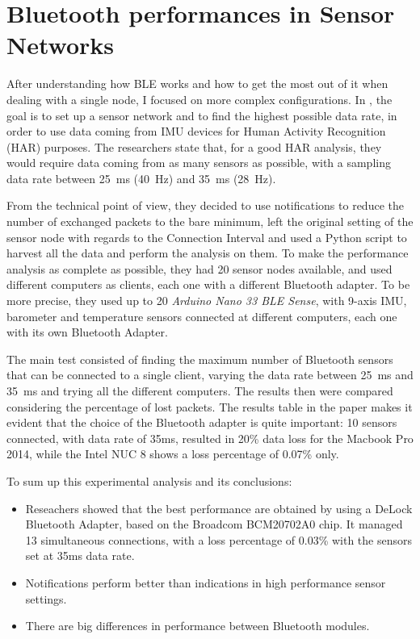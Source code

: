 \section{Bluetooth performances in Sensor Networks} 
After understanding how BLE works and how to get the most out of it when dealing with a single node, I focused on more complex configurations. In \cite{reich2020bluetooth}, the goal is to set up a sensor network and to find the highest possible data rate, in order to use data coming from IMU devices for Human Activity Recognition (HAR) purposes. The researchers state that, for a good HAR analysis, they would require data coming from as many sensors as possible, with a sampling data rate between 25~ms (40~Hz) and 35~ms (28~Hz).     

From the technical point of view, they decided to use notifications to reduce the number of exchanged packets to the bare minimum, left the original setting of the sensor node with regards to the Connection Interval and used a Python script to harvest all the data and perform the analysis on them. To make the performance analysis as complete as possible, they had 20 sensor nodes available, and used different computers as clients, each one with a different Bluetooth adapter. To be more precise, they used up to 20 \textit{Arduino Nano 33 BLE Sense}, with 9-axis IMU, barometer and temperature sensors connected at different computers, each one with its own Bluetooth Adapter. 

The main test consisted of finding the maximum number of Bluetooth sensors that can be connected to a single client, varying the data rate between 25~ms and 35~ms and trying all the different computers. The results then were compared considering the percentage of lost packets. The results table in the paper makes it evident that the choice of the Bluetooth adapter is quite important: 10 sensors connected, with data rate of 35ms, resulted in 20\% data loss for the Macbook Pro 2014, while the Intel NUC 8 shows a loss percentage of 0.07\% only. 

To sum up this experimental analysis and its conclusions:
\begin{itemize}
    \item Reseachers showed that the best performance are obtained by using a DeLock Bluetooth Adapter, based on the Broadcom BCM20702A0 chip. It managed 13 simultaneous connections, with a loss percentage of 0.03\% with the sensors set at 35ms data rate.
    \item Notifications perform better than indications in high performance sensor settings.
    \item There are big differences in performance between Bluetooth modules.
\end{itemize}